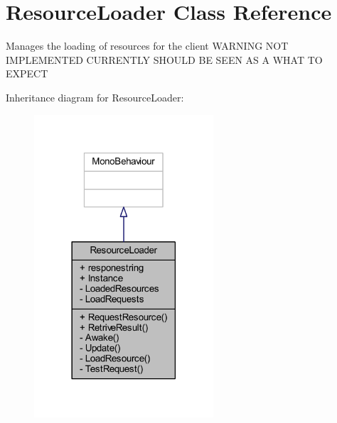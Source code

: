 \hypertarget{class_resource_loader}{}\section{Resource\+Loader Class Reference}
\label{class_resource_loader}


Manages the loading of resources for the client W\+A\+R\+N\+I\+NG N\+OT I\+M\+P\+L\+E\+M\+E\+N\+T\+ED C\+U\+R\+R\+E\+N\+T\+LY S\+H\+O\+U\+LD BE S\+E\+EN AS A W\+H\+AT TO E\+X\+P\+E\+CT  




Inheritance diagram for Resource\+Loader\+:
\nopagebreak
\begin{figure}[H]
\begin{center}
\leavevmode
\includegraphics[width=189pt]{class_resource_loader__inherit__graph}
\end{center}
\end{figure}



